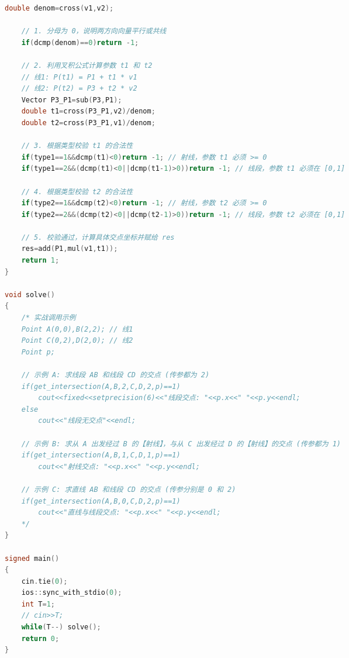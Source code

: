 \documentclass[10pt,landscape,a4paper]{article}
\begin{document}
\begin{multicols*}{3}
\begin{lstlisting}[language=C++]
    double denom=cross(v1,v2);
    
    // 1. 分母为 0，说明两方向向量平行或共线
    if(dcmp(denom)==0)return -1; 
    
    // 2. 利用叉积公式计算参数 t1 和 t2
    // 线1: P(t1) = P1 + t1 * v1
    // 线2: P(t2) = P3 + t2 * v2
    Vector P3_P1=sub(P3,P1);
    double t1=cross(P3_P1,v2)/denom;
    double t2=cross(P3_P1,v1)/denom;
    
    // 3. 根据类型校验 t1 的合法性
    if(type1==1&&dcmp(t1)<0)return -1; // 射线，参数 t1 必须 >= 0
    if(type1==2&&(dcmp(t1)<0||dcmp(t1-1)>0))return -1; // 线段，参数 t1 必须在 [0,1]
    
    // 4. 根据类型校验 t2 的合法性
    if(type2==1&&dcmp(t2)<0)return -1; // 射线，参数 t2 必须 >= 0
    if(type2==2&&(dcmp(t2)<0||dcmp(t2-1)>0))return -1; // 线段，参数 t2 必须在 [0,1]
    
    // 5. 校验通过，计算具体交点坐标并赋给 res
    res=add(P1,mul(v1,t1));
    return 1;
}

void solve()
{
    /* 实战调用示例
    Point A(0,0),B(2,2); // 线1
    Point C(0,2),D(2,0); // 线2
    Point p;
    
    // 示例 A: 求线段 AB 和线段 CD 的交点 (传参都为 2)
    if(get_intersection(A,B,2,C,D,2,p)==1)
        cout<<fixed<<setprecision(6)<<"线段交点: "<<p.x<<" "<<p.y<<endl;
    else
        cout<<"线段无交点"<<endl;
        
    // 示例 B: 求从 A 出发经过 B 的【射线】，与从 C 出发经过 D 的【射线】的交点 (传参都为 1)
    if(get_intersection(A,B,1,C,D,1,p)==1)
        cout<<"射线交点: "<<p.x<<" "<<p.y<<endl;
        
    // 示例 C: 求直线 AB 和线段 CD 的交点 (传参分别是 0 和 2)
    if(get_intersection(A,B,0,C,D,2,p)==1)
        cout<<"直线与线段交点: "<<p.x<<" "<<p.y<<endl;
    */
}

signed main()
{
    cin.tie(0);
    ios::sync_with_stdio(0);
    int T=1;
    // cin>>T;
    while(T--) solve();
    return 0;
}
\end{lstlisting}

\end{multicols*}
\end{document}
